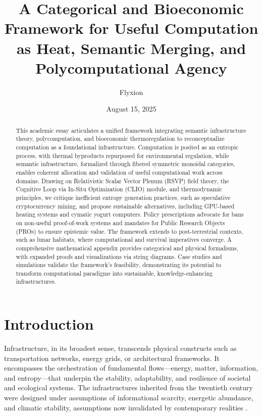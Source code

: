 \documentclass[12pt]{article}
\title{A Categorical and Bioeconomic Framework for Useful Computation as Heat, Semantic Merging, and Polycomputational Agency}
\author{Flyxion}
\date{August 15, 2025}
\begin{document}
\maketitle

\begin{abstract}
This academic essay articulates a unified framework integrating semantic infrastructure theory, polycomputation, and bioeconomic thermoregulation to reconceptualize computation as a foundational infrastructure. Computation is posited as an entropic process, with thermal byproducts repurposed for environmental regulation, while semantic infrastructure, formalized through fibered symmetric monoidal categories, enables coherent allocation and validation of useful computational work across domains. Drawing on Relativistic Scalar Vector Plenum (RSVP) field theory, the Cognitive Loop via In-Situ Optimization (CLIO) module, and thermodynamic principles, we critique inefficient entropy generation practices, such as speculative cryptocurrency mining, and propose sustainable alternatives, including GPU-based heating systems and cymatic yogurt computers. Policy prescriptions advocate for bans on non-useful proof-of-work systems and mandates for Public Research Objects (PROs) to ensure epistemic value. The framework extends to post-terrestrial contexts, such as lunar habitats, where computational and survival imperatives converge. A comprehensive mathematical appendix provides categorical and physical formalisms, with expanded proofs and visualizations via string diagrams. Case studies and simulations validate the framework's feasibility, demonstrating its potential to transform computational paradigms into sustainable, knowledge-enhancing infrastructures.
\end{abstract}

\section{Introduction}
\label{sec:introduction}

Infrastructure, in its broadest sense, transcends physical constructs such as transportation networks, energy grids, or architectural frameworks. It encompasses the orchestration of fundamental flows—energy, matter, information, and entropy—that underpin the stability, adaptability, and resilience of societal and ecological systems. The infrastructures inherited from the twentieth century were designed under assumptions of informational scarcity, energetic abundance, and climatic stability, assumptions now invalidated by contemporary realities \citep{DalyFarley2011}.
\end{document}
